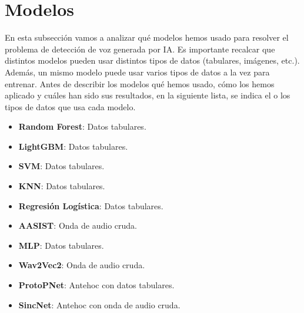 \section{Modelos}
\label{subsec:modelos}

En esta subsección vamos a analizar qué modelos hemos usado para resolver el problema de detección de voz generada por IA. Es importante recalcar que distintos modelos pueden usar distintos tipos de datos (tabulares, imágenes, etc.). Además, un mismo modelo puede usar varios tipos de datos a la vez para entrenar. Antes de describir los modelos qué hemos usado, cómo los hemos aplicado y cuáles han sido sus resultados, en la siguiente lista, se indica el o los tipos de datos que usa cada modelo. 

\begin{itemize}
	\item \textbf{Random Forest}: Datos tabulares.
	\item \textbf{LightGBM}: Datos tabulares.
	\item \textbf{SVM}: Datos tabulares.
	\item \textbf{KNN}: Datos tabulares.
	\item \textbf{Regresión Logística}: Datos tabulares.
	\item \textbf{AASIST}: Onda de audio cruda. 
	\item \textbf{MLP}: Datos tabulares.
	\item \textbf{Wav2Vec2}: Onda de audio cruda.
	\item \textbf{ProtoPNet}: Antehoc con datos tabulares.
	\item \textbf{SincNet}: Antehoc con onda de audio cruda.
\end{itemize}



















